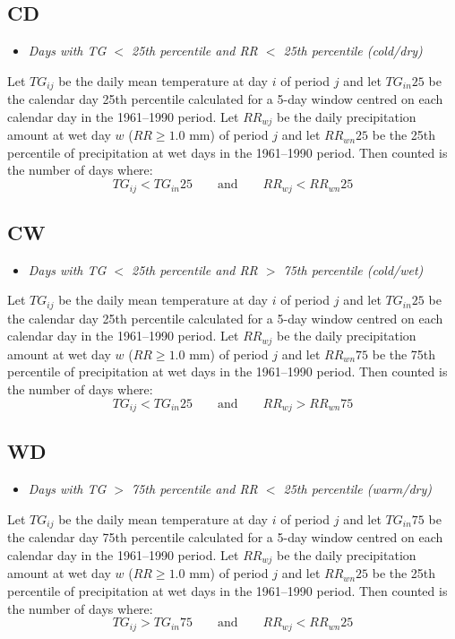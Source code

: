 \documentclass[a4paper,11pt]{article}
\begin{document}
\subsection*{CD}
\begin{itemize}
\item \textit{Days with TG $<$ 25th percentile and RR $<$ 25th percentile (cold/dry)}
\end{itemize}
Let $TG_{ij}$ be the daily mean temperature at day $i$ of period $j$
and let $TG_{in}25$ be the calendar day 25th percentile calculated for
a 5-day window centred on each calendar day in the 1961--1990
period. Let $RR_{wj}$ be the daily precipitation amount at wet day $w$
($RR\geq1.0$ mm) of period $j$ and let $RR_{wn}25$ be the 25th
percentile of precipitation at wet days in the 1961--1990 period. Then
counted is the number of days where:
\begin{equation*}
TG_{ij} < TG_{in}25 \qquad \textrm{and} \qquad RR_{wj} < RR_{wn}25
\end{equation*}

\subsection*{CW}
\begin{itemize}
\item \textit{Days with TG $<$ 25th percentile and RR $>$ 75th percentile (cold/wet)}
\end{itemize}
Let $TG_{ij}$ be the daily mean temperature at day $i$ of period $j$
and let $TG_{in}25$ be the calendar day 25th percentile calculated for
a 5-day window centred on each calendar day in the 1961--1990
period. Let $RR_{wj}$ be the daily precipitation amount at wet day $w$
($RR\geq1.0$ mm) of period $j$ and let $RR_{wn}75$ be the 75th
percentile of precipitation at wet days in the 1961--1990 period. Then
counted is the number of days where:
\begin{equation*}
TG_{ij} < TG_{in}25 \qquad \textrm{and} \qquad RR_{wj} > RR_{wn}75
\end{equation*}

\subsection*{WD}
\begin{itemize}
\item \textit{Days with TG $>$ 75th percentile and RR $<$ 25th percentile (warm/dry)}
\end{itemize}
Let $TG_{ij}$ be the daily mean temperature at day $i$ of period $j$
and let $TG_{in}75$ be the calendar day 75th percentile calculated for
a 5-day window centred on each calendar day in the 1961--1990
period. Let $RR_{wj}$ be the daily precipitation amount at wet day $w$
($RR\geq1.0$ mm) of period $j$ and let $RR_{wn}25$ be the 25th
percentile of precipitation at wet days in the 1961--1990 period. Then
counted is the number of days where:
\begin{equation*}
TG_{ij} > TG_{in}75 \qquad \textrm{and} \qquad RR_{wj} < RR_{wn}25
\end{equation*}
\end{document}
